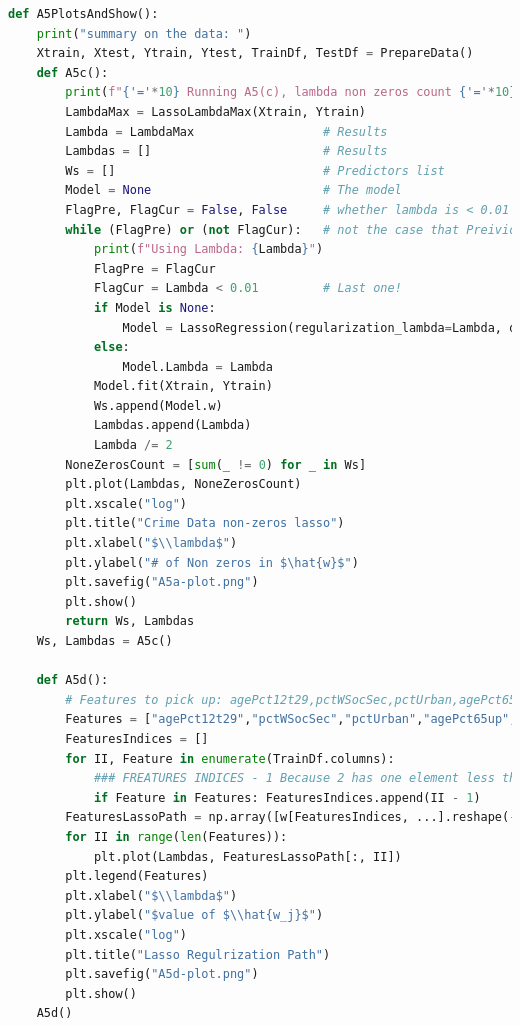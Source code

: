 \documentclass[]{article}
\begin{document}
\begin{lstlisting}[language=python]
def A5PlotsAndShow():
    print("summary on the data: ")
    Xtrain, Xtest, Ytrain, Ytest, TrainDf, TestDf = PrepareData()
    def A5c():
        print(f"{'='*10} Running A5(c), lambda non zeros count {'='*10}")
        LambdaMax = LassoLambdaMax(Xtrain, Ytrain)
        Lambda = LambdaMax                  # Results
        Lambdas = []                        # Results
        Ws = []                             # Predictors list
        Model = None                        # The model
        FlagPre, FlagCur = False, False     # whether lambda is < 0.01
        while (FlagPre) or (not FlagCur):   # not the case that Preivious is > 0.01, current is < 0.01
            print(f"Using Lambda: {Lambda}")
            FlagPre = FlagCur
            FlagCur = Lambda < 0.01         # Last one!
            if Model is None:
                Model = LassoRegression(regularization_lambda=Lambda, delta=1e-4)
            else:
                Model.Lambda = Lambda
            Model.fit(Xtrain, Ytrain)
            Ws.append(Model.w)
            Lambdas.append(Lambda)
            Lambda /= 2
        NoneZerosCount = [sum(_ != 0) for _ in Ws]
        plt.plot(Lambdas, NoneZerosCount)
        plt.xscale("log")
        plt.title("Crime Data non-zeros lasso")
        plt.xlabel("$\\lambda$")
        plt.ylabel("# of Non zeros in $\hat{w}$")
        plt.savefig("A5a-plot.png")
        plt.show()
        return Ws, Lambdas
    Ws, Lambdas = A5c()

    def A5d():
        # Features to pick up: agePct12t29,pctWSocSec,pctUrban,agePct65up
        Features = ["agePct12t29","pctWSocSec","pctUrban","agePct65up", "householdsize"]
        FeaturesIndices = []
        for II, Feature in enumerate(TrainDf.columns):
            ### FREATURES INDICES - 1 Because 2 has one element less than the original data frame!!!
            if Feature in Features: FeaturesIndices.append(II - 1)
        FeaturesLassoPath = np.array([w[FeaturesIndices, ...].reshape(-1) for w in Ws])
        for II in range(len(Features)):
            plt.plot(Lambdas, FeaturesLassoPath[:, II])
        plt.legend(Features)
        plt.xlabel("$\\lambda$")
        plt.ylabel("$value of $\\hat{w_j}$")
        plt.xscale("log")
        plt.title("Lasso Regulrization Path")
        plt.savefig("A5d-plot.png")
        plt.show()
    A5d()


\end{lstlisting}
\end{document}
